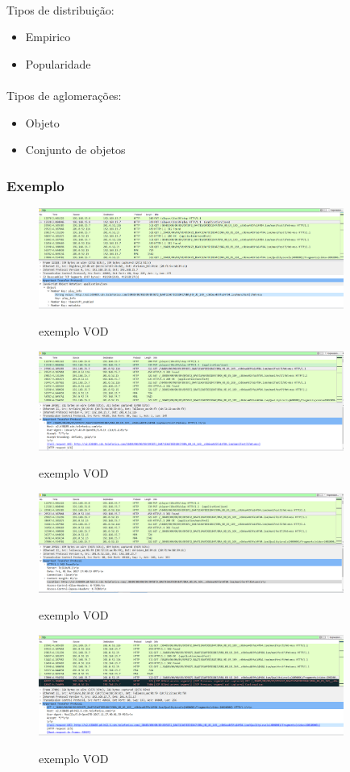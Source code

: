 \paragraph{} Tipos de distribui\c{c}\~ao:
\begin{itemize}
	\item Empirico
	\item Popularidade
\end{itemize}
\paragraph{} Tipos de aglomera\c{c}\~oes:
\begin{itemize}
	\item Objeto
	\item Conjunto de objetos
\end{itemize}

\subsubsection{Exemplo}

\begin{figure}[h]
\caption{exemplo VOD}
\includegraphics[width=10cm]{Figuras/exemplo_vod_1.png} 
\label{figura:exemplo_vod_1}
\end{figure}

\begin{figure}[h]
\caption{exemplo VOD}
\includegraphics[width=10cm]{Figuras/exemplo_vod_2.png} 
\label{figura:exemplo_vod_2}
\end{figure}

\begin{figure}[h]
\caption{exemplo VOD}
\includegraphics[width=10cm]{Figuras/exemplo_vod_3.png} 
\label{figura:exemplo_vod_3}
\end{figure}

\begin{figure}[h]
\caption{exemplo VOD}
\includegraphics[width=10cm]{Figuras/exemplo_vod_4.png} 
\label{figura:exemplo_vod_4}
\end{figure}